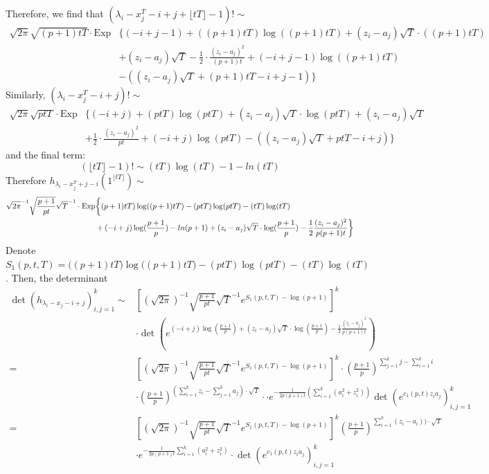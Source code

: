 \documentclass[12pt]{article}
\begin{document}
Therefore, we find that $(\lambda_{i}-x_{j}^{T}-i+j+\lfloor tT \rfloor -1)!\sim$
\begin{align*}
	\sqrt{2\pi}\sqrt{(p+1)tT}\cdot \text{Exp}&\{(-i+j-1) + ((p+1)tT)\log((p+1)tT)+(z_{i}-a_{j})\sqrt{T}\cdot ((p+1)tT)\\
	&+(z_{i}-a_{j})\sqrt{T}-\frac{1}{2}\cdot\frac{(z_{i}-a_{j})^2}{(p+1)t}+(-i+j-1)\log((p+1)tT)\\&-\left((z_{i}-a_{j})\sqrt{T} + (p+1)tT-i+j-1\right)\}
\end{align*}
Similarly, $(\lambda_{i}-x_{j}^{T}-i+j)!\sim$
\begin{align*}
\sqrt{2\pi}\sqrt{ptT}\cdot \text{Exp}&\{(-i+j) + (ptT)\log(ptT)+(z_{i}-a_{j})\sqrt{T}\cdot \log(ptT)+(z_{i}-a_{j})\sqrt{T}\\
& +\frac{1}{2}\cdot\frac{(z_{i}-a_{j})^2}{pt}+(-i+j)\log(ptT)-((z_{i}-a_{j})\sqrt{T} + ptT-i+j)\}
\end{align*} and the final term: $$
(\lfloor tT \rfloor-1)!\sim (tT)\log(tT)-1-ln(tT)$$
Therefore $h_{\lambda_{i}-x^{T}_{j}+j-i}(1^{\lfloor tT \rfloor})\sim$
\begin{align*}
	\sqrt{2\pi}^{-1}\sqrt{\frac{p+1}{pt}}\sqrt{T}^{-1}\cdot \text{Exp}&\bigg\{\vphantom ((p+1)tT)\log((p+1)tT)-(ptT)\log(ptT)-(tT)\log(tT)\\
	& +(-i+j)\log(\frac{p+1}{p})-ln(p+1)+(z_{i}-a_{j})\sqrt{T}\cdot \log(\frac{p+1}{p})-\frac{1}{2}\frac{(z_{i}-a_{j})^{2}}{p(p+1)t}\bigg\}
\end{align*}
Denote $S_{1}(p,t,T)=\big((p+1)tT)\log((p+1)tT\big)-(ptT)\log(ptT)-(tT)\log(tT)$. Then, the determinant 
\begin{align*} 
\det(h_{\lambda_{i}-x_{j}-i+j})_{i,j=1}^{k} \sim&\left[(\sqrt{2\pi})^{-1}\sqrt{\frac{p+1}{pt}}\sqrt{T}^{-1}e^{S_{1}(p,t,T)-\log(p+1)}\right]^{k}\\
&\cdot
	 \det\left(e^{(-i+j)\log(\frac{p+1}{p})+(z_{i}-a_{j})\sqrt{T}\cdot \log(\frac{p+1}{p})-\frac{1}{2}\frac{(z_{i}-a_{j})^2}{p(p+1)t}}\right)\\
	=&\left[(\sqrt{2\pi})^{-1}\sqrt{\frac{p+1}{pt}}\sqrt{T}^{-1}e^{S_{1}(p,t,T)-\log(p+1)}\right]^{k}\cdot \left(\frac{p+1}{p}\right)^{\sum_{j=1}^k j-\sum_{i=1}^{k}i} \\
	 &\cdot\left(\frac{p+1}{p}\right)^{\left(\sum_{i=1}^{k}z_{i}-\sum_{j=1}^{k}a_{j}\right)\cdot\sqrt{T}}\cdot \cdot e^{-\frac{1}{2p(p+1)t}(\sum_{i=1}^{k}(a_{i}^2+z_{i}^2))}\det(e^{c_{1}(p,t)z_{i}a_{j}})_{i,j=1}^{k}\\
	 =& \left[(\sqrt{2\pi})^{-1}\sqrt{\frac{p+1}{pt}}\sqrt{T}^{-1}e^{S_{1}(p,t,T)-\log(p+1)}\right]^{k}\left(\frac{p+1}{p}\right)^{\sum_{i=1}^{k}(z_{i}-a_{i}))\cdot\sqrt{T}} \\
	&\cdot e^{-\frac{1}{2p(p+1)t}\sum_{i=1}^{k}(a_{i}^2+z_{i}^2)}\cdot \det\left(e^{c_{1}(p,t)z_{i}a_{j}}\right)_{i,j=1}^{k}
\end{align*}
\end{document}
